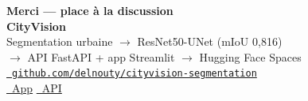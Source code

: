 \documentclass[aspectratio=169,11pt]{beamer}
\begin{document}
{
\hypersetup{urlcolor=white}
\begin{frame}[plain]
  \centering
  \vfill
  {\Large\textbf{Merci --- place à la discussion}}\\[1.2em]
  {\large\textbf{CityVision}}\\[0.5em]
  Segmentation urbaine $\rightarrow$ ResNet50-UNet (mIoU 0{,}816)\\[0.3em]
  $\rightarrow$ API FastAPI + app Streamlit $\rightarrow$ Hugging Face Spaces
  \vfill
  {\footnotesize\href{https://github.com/delnouty/cityvision-segmentation}{\color{white}\faGithub~\texttt{github.com/delnouty/cityvision-segmentation}}}\\[0.8em]
  {\footnotesize
    \href{https://huggingface.co/spaces/DaryaEL/cityvision}{\color{white}\faGlobe~App}
    \quad\textbar\quad
    \href{https://daryael-cityvision-api.hf.space/docs}{\color{white}\faServer~API}}
  \vfill
\end{frame}
}

\appendix
\end{document}
